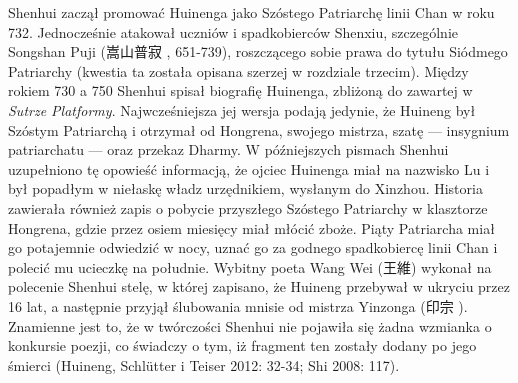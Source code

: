 Shenhui zaczął promować Huinenga jako Szóstego Patriarchę linii Chan w roku 732.
Jednocześnie atakował uczniów i spadkobierców Shenxiu, szczególnie Songshan Puji (嵩山普寂 , 651-739), roszczącego sobie prawa do tytułu Siódmego Patriarchy (kwestia ta została opisana szerzej w rozdziale trzecim).
Między rokiem 730 a 750 Shenhui spisał biografię Huinenga, zbliżoną do zawartej w \textit{Sutrze Platformy}.
Najwcześniejsza jej wersja podają jedynie, że Huineng był Szóstym Patriarchą i otrzymał od Hongrena, swojego mistrza, szatę --- insygnium patriarchatu --- oraz przekaz Dharmy.
W późniejszych pismach Shenhui uzupełniono tę opowieść informacją, że ojciec Huinenga miał na nazwisko Lu i był popadłym w niełaskę władz urzędnikiem, wysłanym do Xinzhou.
Historia zawierała również zapis o pobycie przyszłego Szóstego Patriarchy w klasztorze Hongrena, gdzie przez osiem miesięcy miał młócić zboże.
Piąty Patriarcha miał go potajemnie odwiedzić w nocy, uznać go za godnego spadkobiercę linii Chan i polecić mu ucieczkę na południe.
Wybitny poeta Wang Wei (王維) wykonał na polecenie Shenhui stelę, w której zapisano, że Huineng przebywał w ukryciu przez 16 lat, a następnie przyjął ślubowania mnisie od mistrza Yinzonga (印宗 ).
Znamienne jest to, że w twórczości Shenhui nie pojawiła się żadna wzmianka o konkursie poezji, co świadczy o tym, iż fragment ten zostały dodany po jego śmierci
(Huineng, Schlütter i Teiser 2012: 32-34; Shi 2008: 117).

